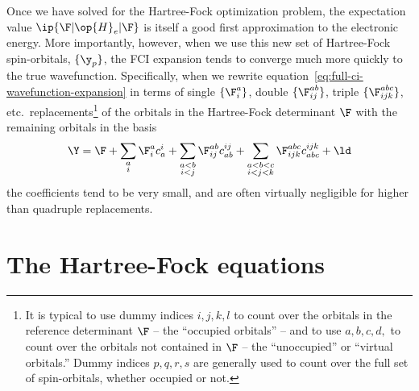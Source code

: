Once we have solved for the Hartree-Fock optimization problem, the expectation value $\ip{\F|\op{H}_e|\F}$ is itself a good first approximation to the electronic energy.
More importantly, however, when we use this new set of Hartree-Fock spin-orbitals, $\{\y_p\}$, the FCI expansion tends to converge much more quickly to the true wavefunction.
Specifically, when we rewrite equation~\ref{eq:full-ci-wavefunction-expansion} in terms of single $\{\F_i^a\}$, double $\{\F_{ij}^{ab}\}$, triple $\{\F_{ijk}^{abc}\}$, etc.\ replacements\footnote{It is typical to use dummy indices $i,j,k,l$ to count over the orbitals in the reference determinant $\F$ -- the ``occupied orbitals'' -- and to use $a,b,c,d,$ to count over the orbitals not contained in $\F$ -- the ``unoccupied'' or ``virtual orbitals.''  Dummy indices $p,q,r,s$ are generally used to count over the full set of spin-orbitals, whether occupied or not.} of the orbitals in the Hartree-Fock determinant $\F$ with the remaining orbitals in the basis
\begin{align}
  \Y
=
  \F
+
  \sum_{\substack{a\\i}}
  \F_i^ac_a^i
+
  \sum_{\substack{a<b\\i<j}}
  \F_{ij}^{ab}c_{ab}^{ij}
+
  \sum_{\substack{a<b<c\\i<j<k}}
  \F_{ijk}^{abc}c_{abc}^{ijk}
+\ld
\end{align}
the coefficients tend to be very small, and are often virtually negligible for higher than quadruple replacements.

\section{The Hartree-Fock equations}

